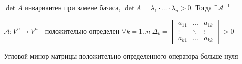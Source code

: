 \documentclass[12pt]{article}
\begin{document}
    \Notas $\det A$ инвариантен при замене базиса, $\det A = \lambda_1 \cdot \dots \cdot \lambda_n > 0$. Тогда $\exists \mathcal{A}^{-1}$

    \hypertarget{criterionSilvester}{}

    \begin{MyTheorem}

    $\mathcal{A}: V^n \to V^n$ - положительно определен \Longleftrightarrow $\forall k = 1..n \ \Delta_k =
    \begin{vmatrix}a_{11} & \dots & a_{1k} \\ \vdots & \ddots & \vdots \\ a_{k1} & \dots & a_{kk}\end{vmatrix} > 0$ 

    Угловой минор матрицы положительно определенного оператора больше нуля

    \end{MyTheorem}
\end{document}
